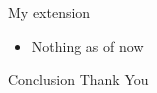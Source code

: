 \documentclass[presentation]{beamer}
\begin{document}
\begin{frame}[label={sec:org3f00a2e}]{My extension}
\begin{itemize}
\item Nothing as of now
\end{itemize}
\end{frame}
\begin{frame}[label={sec:orga37b084}]{Conclusion}
Thank You
\end{frame}
\end{document}
